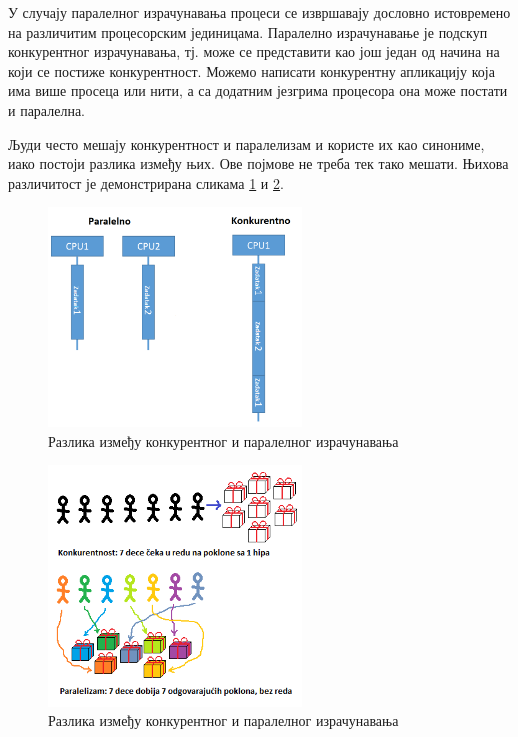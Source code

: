 \documentclass[12pt,oneside]{memoir}
\begin{document}
У случају паралелног израчунавања процеси се извршавају дословно истовремено на различитим процесорским јединицама.
Паралелно израчунавање је подскуп конкурентног израчунавања, тј. може се представити као још један од начина на који се постиже конкурентност. Можемо написати конкурентну апликацију која има више просеца или нити, а са додатним језгрима процесора она може постати и паралелна. 

Људи често мешају конкурентност и паралелизам и користе их као синониме, иако постоји разлика између њих. Ове појмове не треба тек тако мешати. Њихова различитост је демонстрирана сликама \ref{fig:ParVSCon1} и \ref{fig:ParVSCon2}.
\begin{figure}[!ht]
  \centering
  \includegraphics[width=0.6\textwidth]{parallel-vs-concurrent-dotnet-core.png}
  \caption{Разлика између конкурентног и паралелног израчунавања}
  \label{fig:ParVSCon1}
\end{figure}

\begin{figure}[!ht]
  \centering
  \includegraphics[width=0.6\textwidth]{parallelism-centric.png}
  \caption{Разлика између конкурентног и паралелног израчунавања}
  \label{fig:ParVSCon2}
\end{figure}
%
 
\end{document}
